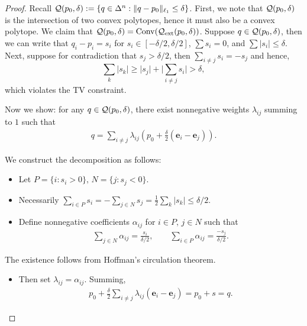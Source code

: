 \begin{proof}

Recall $\mathcal{Q}(p_0,\delta) := \{q \in \Delta^n: \|q - p_0\|_{\ell_1} \leq \delta\}$. First, we note that $\mathcal{Q}(p_0,\delta)$ is the intersection of two convex polytopes, hence it must also be a convex polytope. We claim that $\mathcal{Q}(p_0,\delta) = \mathrm{Conv}(\mathcal{Q}_{\mathrm{ext}}(p_0,\delta))$. Suppose $q \in \mathcal{Q}(p_0,\delta)$, then we can write that 
$q_i - p_i  = s_i$
for $s_i \in [-\delta/2,\delta/2]$, $\sum s_i = 0$, and $\sum \lvert s_i\rvert \leq \delta$. Next, suppose for contradiction that $s_j > \delta/2$, then $\sum_{i \neq j}s_i = -s_j$ and hence,
$$\sum_{k}\lvert s_k\rvert \geq \lvert s_j\rvert + \lvert\sum_{i \neq j}s_i\rvert > \delta,$$
which violates the TV constraint. 

Now we show: for any $q \in \mathcal{Q}(p_0,\delta)$,
there exist nonnegative weights $\lambda_{ij}$ summing to $1$ such that
\begin{align*}
    q = \sum_{i \neq j} \lambda_{ij} \left( p_0 + \frac{\delta}{2}(\mathbf{e}_i - \mathbf{e}_j) \right).
\end{align*}

We construct the decomposition as follows:

\begin{itemize}
    \item Let $P = \{i : s_i > 0\},\, N = \{j : s_j < 0\}$.
    \item Necessarily $\sum_{i \in P} s_i = - \sum_{j \in N} s_j 
    = \frac{1}{2} \sum_k |s_k| \le \delta/2$.
    \item Define nonnegative coefficients $\alpha_{ij}$ for $i \in P,\, j \in N$
    such that
    \begin{align*}
        \sum_{j \in N} \alpha_{ij} = \frac{s_i}{\delta/2}, 
        \qquad
        \sum_{i \in P} \alpha_{ij} = \frac{-s_j}{\delta/2}.
    \end{align*}
\end{itemize}

The existence follows from Hoffman’s circulation theorem.

\begin{itemize}
    \item Then set $\lambda_{ij} = \alpha_{ij}$. Summing,
    \begin{align*}
        p_0 + \frac{\delta}{2} \sum_{i \neq j} \lambda_{ij}(\mathbf{e}_i - \mathbf{e}_j)
        = p_0 + s = q.
    \end{align*}
\end{itemize}


\end{proof}
